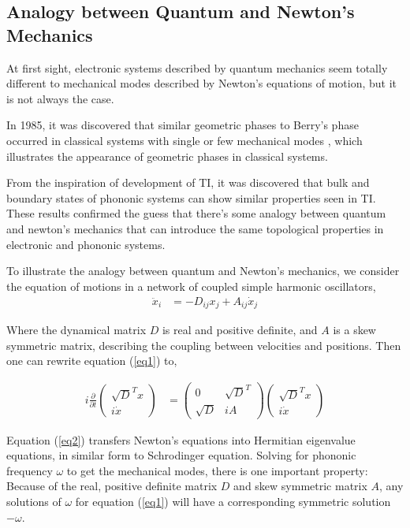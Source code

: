 \documentclass[aps,pre,preprint,groupedaddress]{revtex4-1}
\begin{document}
\subsection{Analogy between Quantum and Newton's Mechanics}

At first sight, electronic systems described by quantum mechanics seem totally different to mechanical modes described by Newton's equations of motion, but it is not always the case.

In 1985, it was discovered that similar geometric phases to Berry's phase \cite{cite-key5} occurred in classical systems with single or few mechanical modes \cite{cite-key9}, which illustrates the appearance of geometric phases in classical systems.

From the inspiration of development of TI, it was discovered that bulk and boundary states of phononic systems can show similar properties seen in TI\cite{cite-key11,cite-key12}. These results confirmed the guess that there's some analogy between quantum and newton's mechanics that can introduce the same topological properties in electronic and phononic systems.

To illustrate the analogy between quantum and Newton's mechanics, we consider the equation of motions in a network of coupled simple harmonic oscillators,
\begin{align}
\ddot{x}_i &= -D_{ij}x_j+A_{ij}\dot{x}_j
\label{eq1}
\end{align}

Where the dynamical matrix $D$ is real and positive definite, and $A$ is a skew symmetric matrix, describing the coupling between velocities and positions. Then \cite{susstrunk2016classification} one can rewrite equation (\ref{eq1}) to,

\begin{align}
i\frac{\partial}{\partial t}
\begin{pmatrix}
\sqrt{D}^{T}x\\
i\dot{x}
\end{pmatrix}
&=
\begin{pmatrix}
0 & \sqrt{D}^{T}\\
\sqrt{D} & iA
\end{pmatrix}
\begin{pmatrix}
\sqrt{D}^{T}x\\
i\dot{x}
\end{pmatrix}
\label{eq2}
\end{align}

Equation (\ref{eq2}) transfers Newton's equations into Hermitian eigenvalue equations, in similar form to Schrodinger equation. Solving for phononic frequency $\omega$ to get the mechanical modes, there is one important property: Because of the real, positive definite matrix $D$ and skew symmetric matrix $A$, any solutions of $\omega$ for equation (\ref{eq1}) will have a corresponding symmetric solution $-\omega$.
\end{document}
